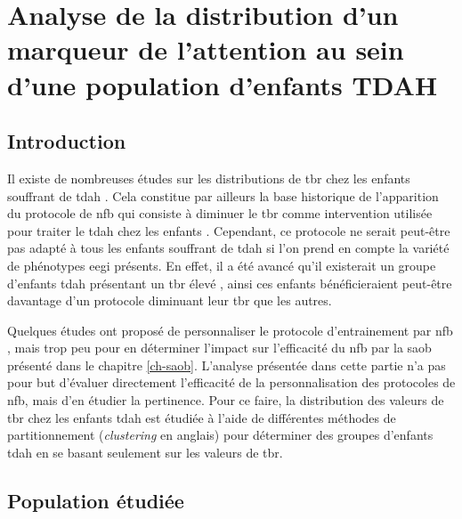 \chapter{Analyse de la distribution d'un marqueur de l'attention au sein d'une population d'enfants TDAH} \label{chapitre-4}

\section*{Introduction}
Il existe de nombreuses études sur les distributions de \gls{tbr} chez les enfants souffrant de \gls{tdah}
\citep{Arns2013, Clarke2001, Zhang2017}. Cela constitue par ailleurs la base historique de l'apparition du protocole de \gls{nfb} qui consiste à diminuer le \gls{tbr} 
comme intervention utilisée
pour traiter le \gls{tdah} chez les enfants \citep{Arnold2014, Deilami2016, Gevensleben2009, VanDongen2013}. Cependant, ce protocole ne serait 
peut-être pas adapté à tous les enfants souffrant de \gls{tdah} si 
l'on prend en compte la variété de phénotypes \gls{eegi} présents. En effet, il a été avancé qu'il existerait un groupe d'enfants \gls{tdah} présentant un \gls{tbr} élevé 
\citep{Zhang2017, Clarke2011}, ainsi ces enfants bénéficieraient peut-être davantage d'un protocole diminuant leur \gls{tbr} que les autres. 

Quelques études ont proposé de personnaliser le protocole d'entrainement par \gls{nfb} \citep{Bazanova2018, Escolano2014}, mais trop peu pour en déterminer
l'impact sur l'efficacité du \gls{nfb} par la \gls{saob} présenté dans le chapitre \ref{ch-saob}. L'analyse présentée dans cette partie n'a pas pour but d'évaluer directement l'efficacité de la 
personnalisation des protocoles de \gls{nfb}, mais d'en étudier la pertinence. Pour ce faire, la distribution des valeurs de \gls{tbr} chez les enfants \gls{tdah} est 
étudiée à l'aide de différentes méthodes de partitionnement (\textit{clustering} en anglais) pour déterminer des groupes d'enfants \gls{tdah} en se basant seulement sur les 
valeurs de \gls{tbr}. 
\newpage

\section{Population étudiée}

